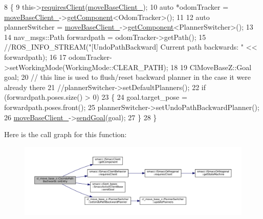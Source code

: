 \begin{DoxyCode}
8 \{
9     this->\hyperlink{classsmacc_1_1ISmaccClientBehavior_a32b16e99e3b4cb289414203dc861a440}{requiresClient}(\hyperlink{classcl__move__base__z_1_1CbUndoPathBackwards_a306d616dab00f50141abed4bfb47aeb2}{moveBaseClient\_});
10     \textcolor{keyword}{auto} *odomTracker = \hyperlink{classcl__move__base__z_1_1CbUndoPathBackwards_a306d616dab00f50141abed4bfb47aeb2}{moveBaseClient\_}->\hyperlink{classsmacc_1_1ISmaccClient_adef78db601749ca63c19e74a27cb88cc}{getComponent}<OdomTracker>();
11 
12     \textcolor{keyword}{auto} plannerSwitcher = \hyperlink{classcl__move__base__z_1_1CbUndoPathBackwards_a306d616dab00f50141abed4bfb47aeb2}{moveBaseClient\_}->\hyperlink{classsmacc_1_1ISmaccClient_adef78db601749ca63c19e74a27cb88cc}{getComponent}<PlannerSwitcher>();
13 
14     nav\_msgs::Path forwardpath = odomTracker->getPath();
15     \textcolor{comment}{//ROS\_INFO\_STREAM("[UndoPathBackward] Current path backwards: " << forwardpath);}
16 
17     odomTracker->setWorkingMode(WorkingMode::CLEAR\_PATH);
18 
19     ClMoveBaseZ::Goal goal;
20     \textcolor{comment}{// this line is used to flush/reset backward planner in the case it were already there}
21     \textcolor{comment}{//plannerSwitcher->setDefaultPlanners();}
22     \textcolor{keywordflow}{if} (forwardpath.poses.size() > 0)
23     \{
24         goal.target\_pose = forwardpath.poses.front();
25         plannerSwitcher->setUndoPathBackwardPlanner();
26         \hyperlink{classcl__move__base__z_1_1CbUndoPathBackwards_a306d616dab00f50141abed4bfb47aeb2}{moveBaseClient\_}->\hyperlink{classsmacc_1_1client__bases_1_1SmaccActionClientBase_a9c47a5094ac8afb01680307fe5eca922}{sendGoal}(goal);
27     \}
28 \}
\end{DoxyCode}
Here is the call graph for this function\+:
\nopagebreak
\begin{figure}[H]
\begin{center}
\leavevmode
\includegraphics[width=350pt]{classcl__move__base__z_1_1CbUndoPathBackwards_a32e680530375b62c7053bf173f6b2b1b_cgraph}
\end{center}
\end{figure}
\mbox{\label{classcl__move__base__z_1_1CbUndoPathBackwards_a20cee921ad92db16f8d17c3c3b9c2daf}} 

